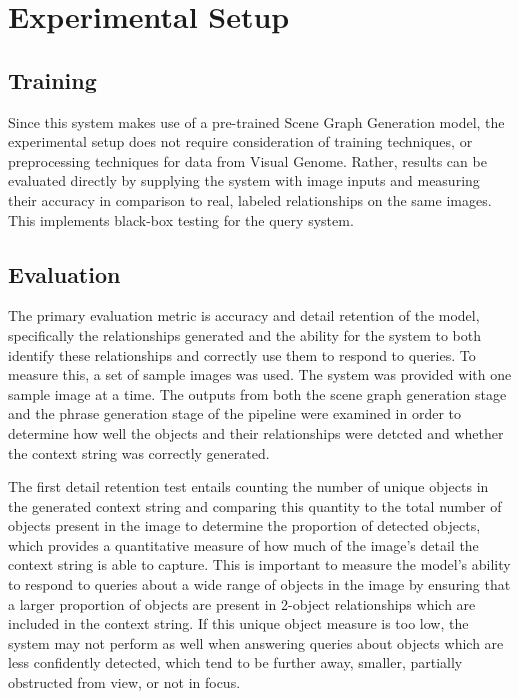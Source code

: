 \documentclass[letterpaper, 10 pt, conference]{ieeeconf}  %
\begin{document}
\section{Experimental Setup}
\subsection*{Training}
    Since this system makes use of a pre-trained Scene Graph Generation model, the experimental setup does not require consideration of training techniques, or preprocessing techniques for data from Visual Genome. Rather, results can be evaluated directly by supplying the system with image inputs and measuring their accuracy in comparison to real, labeled relationships on the same images. This implements black-box testing for the query system.

\subsection*{Evaluation}

    The primary evaluation metric is accuracy and detail retention of the model, specifically the relationships generated and the ability for the system to both identify these relationships and correctly use them to respond to queries. To measure this, a set of sample images was used. The system was provided with one sample image at a time. The outputs from both the scene graph generation stage and the phrase generation stage of the pipeline were  examined in order to determine how well the objects and their relationships were detcted and whether the context string was correctly generated. 
    
    The first detail retention test entails counting the number of unique objects in the generated context string and comparing this quantity to the total number of objects present in the image to determine the proportion of detected objects, which provides a quantitative measure of how much of the image's detail the context string is able to capture. This is important to measure the model's ability to respond to queries about a wide range of objects in the image by ensuring that a larger proportion of objects are present in 2-object relationships which are included in the context string. If this unique object measure is too low, the system may not perform as well when answering queries about objects which are less confidently detected, which tend to be further away, smaller, partially obstructed from view, or not in focus.
    
\end{document}

